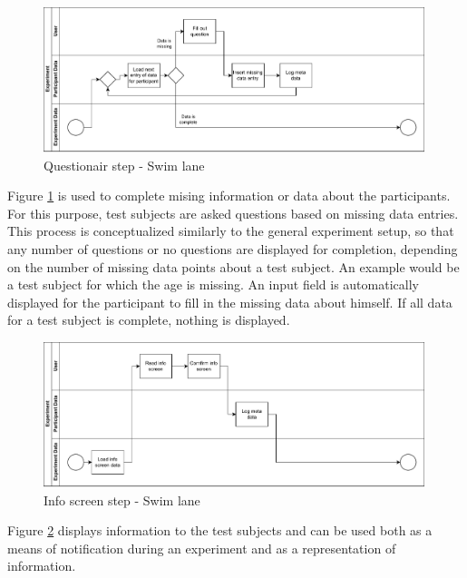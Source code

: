 \begin{figure}[htbp]
    \centering
    \includegraphics[width=0.99\textwidth, keepaspectratio]{content/05_design_and_dev_artefacts/QuestionairSwimLane.drawio.pdf}
    \caption{Questionair step - Swim lane}    
    \label{fig:questionairSwimLane}
\end{figure}

Figure \ref{fig:questionairSwimLane} is used to complete mising information or data about the participants. For this purpose, test subjects are asked questions based on missing data entries. This process is conceptualized similarly to the general experiment setup, so that any number of questions or no questions are displayed for completion, depending on the number of missing data points about a test subject. An example would be a test subject for which the age is missing. An input field is automatically displayed for the participant to fill in the missing data about himself. If all data for a test subject is complete, nothing is displayed.

\begin{figure}[htbp]
    \centering
    \includegraphics[width=0.99\textwidth, keepaspectratio]{content/05_design_and_dev_artefacts/InfoScreenSwimLane.drawio.pdf}
    \caption{Info screen step - Swim lane}    
    \label{fig:infoScreenSwimLane}
\end{figure}

Figure \ref{fig:infoScreenSwimLane} displays information to the test subjects and can be used both as a means of notification during an experiment and as a representation of information.

